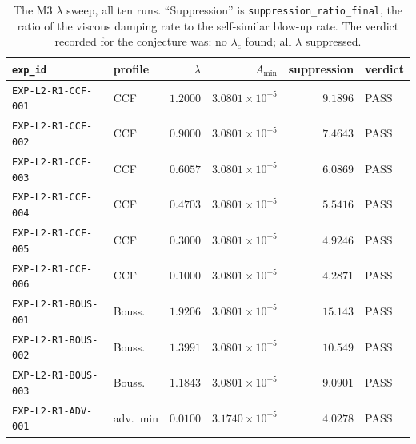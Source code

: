 \begin{table}[ht]
\centering
\small
\begin{tabular}{@{}l l r r r l@{}}
\toprule
\texttt{exp\_id} & profile & \(\lambda\) & \(A_{\min}\) & suppression &
verdict \\
\midrule
\texttt{EXP-L2-R1-CCF-001} & CCF & \(1.2000\) & \(3.0801\!\times\!10^{-5}\) & \(9.1896\) & \textsf{PASS} \\
\texttt{EXP-L2-R1-CCF-002} & CCF & \(0.9000\) & \(3.0801\!\times\!10^{-5}\) & \(7.4643\) & \textsf{PASS} \\
\texttt{EXP-L2-R1-CCF-003} & CCF & \(0.6057\) & \(3.0801\!\times\!10^{-5}\) & \(6.0869\) & \textsf{PASS} \\
\texttt{EXP-L2-R1-CCF-004} & CCF & \(0.4703\) & \(3.0801\!\times\!10^{-5}\) & \(5.5416\) & \textsf{PASS} \\
\texttt{EXP-L2-R1-CCF-005} & CCF & \(0.3000\) & \(3.0801\!\times\!10^{-5}\) & \(4.9246\) & \textsf{PASS} \\
\texttt{EXP-L2-R1-CCF-006} & CCF & \(0.1000\) & \(3.0801\!\times\!10^{-5}\) & \(4.2871\) & \textsf{PASS} \\
\texttt{EXP-L2-R1-BOUS-001} & Bouss. & \(1.9206\) & \(3.0801\!\times\!10^{-5}\) & \(15.143\) & \textsf{PASS} \\
\texttt{EXP-L2-R1-BOUS-002} & Bouss. & \(1.3991\) & \(3.0801\!\times\!10^{-5}\) & \(10.549\) & \textsf{PASS} \\
\texttt{EXP-L2-R1-BOUS-003} & Bouss. & \(1.1843\) & \(3.0801\!\times\!10^{-5}\) & \(9.0901\) & \textsf{PASS} \\
\texttt{EXP-L2-R1-ADV-001} & adv.\ min & \(0.0100\) & \(3.1740\!\times\!10^{-5}\) & \(4.0278\) & \textsf{PASS} \\
\bottomrule
\end{tabular}
\caption[The \(\lambda\) sweep]{The M3 \(\lambda\) sweep, all ten runs.
``Suppression'' is \texttt{suppression\_ratio\_final}, the ratio of the
viscous damping rate to the self-similar blow-up rate. The verdict recorded
for the conjecture was: no \(\lambda_c\) found; all \(\lambda\)
suppressed.}
\label{tab:lambda-sweep}
\end{table}

